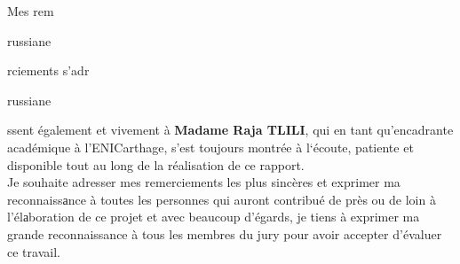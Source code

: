 Mes rem\begin{otherlanguage*}{russian}{e}\end{otherlanguage*}rciements s’adr\begin{otherlanguage*}{russian}{e}\end{otherlanguage*}ssent également et vivement à \textbf{Madame Raja TLILI}, qui en tant qu'encadrante académique à l’ENICarthage, s’est toujours montrée à l‘écoute, patiente et disponible tout au long de la réalisation de ce rapport.\\

Je souhaite adresser mes remerciements les plus sincères et exprimer ma reconnaissаnce à toutes les personnes qui auront contribué de près ou de loin à l’élаboration de ce projet et avec beaucoup d’égards, je tiens à exprimer ma grande reconnaissance à tous les membres du jury pour avoir accepter d’évaluer ce travail.

